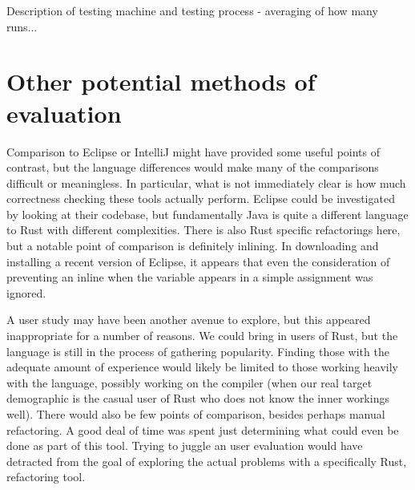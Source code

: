 Description of testing machine and testing process - averaging of how many runs... 


\section{Other potential methods of evaluation} \label{S:otherstuff}



Comparison to Eclipse or IntelliJ might have provided some useful points of contrast, but the language differences would make many of the comparisons difficult or meaningless. In particular, what is not immediately clear is how much correctness checking these tools actually perform. Eclipse could be investigated by looking at their codebase, but fundamentally Java is quite a different language to Rust with different complexities. There is also Rust specific refactorings here, but a notable point of comparison is definitely inlining. In downloading and installing a recent version of Eclipse, it appears that even the consideration of preventing an inline when the variable appears in a simple assignment was ignored.

A user study may have been another avenue to explore, but this appeared inappropriate for a number of reasons. We could bring in users of Rust, but the language is still in the process of gathering popularity. Finding those with the adequate amount of experience would likely be limited to those working heavily with the language, possibly working on the compiler (when our real target demographic is the casual user of Rust who does not know the inner workings well). There would also be few points of comparison, besides perhaps manual refactoring. A good deal of time was spent just determining what could even be done as part of this tool. Trying to juggle an user evaluation would have detracted from the goal of exploring the actual problems with a specifically Rust, refactoring tool. 
